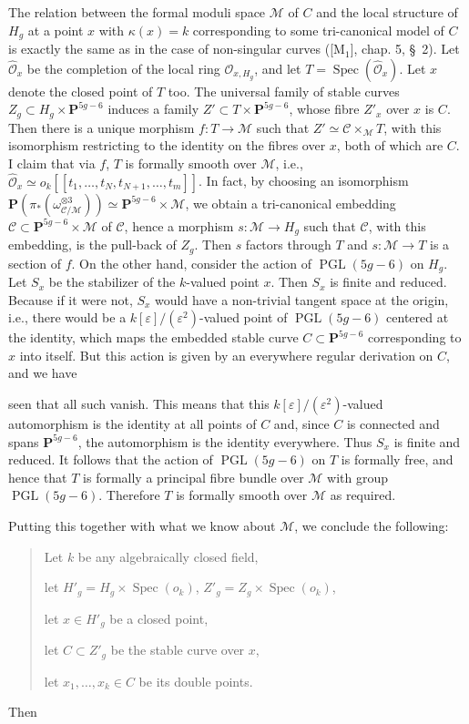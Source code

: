 \documentclass[10pt]{article}
\newcommand{\Spec}{\operatorname{Spec}}
\newcommand{\PGL}{\operatorname{PGL}}
\newcommand{\cO}{\mathcal O}
\newcommand{\cM}{\mathcal M}
\newcommand{\cC}{\mathcal C}
\newcommand{\PP}{\mathbf P}
\newcommand{\eps}{\varepsilon}
\begin{document}
The relation between the formal moduli space $\cM$ of $C$ and the local structure of $H_g$ at a point $x$ with $\kappa(x)=k$ corresponding to some tri-canonical model of $C$ is exactly the same as in the case of non-singular curves ([M$_1$], chap. 5, \S~2). Let $\widehat{\cO}_x$ be the completion of the local ring $\cO_{x,H_g}$, and let $T=\Spec(\widehat{\cO}_x)$. Let $x$ denote the closed point of $T$ too. The universal family of stable curves $Z_g\subset H_g\times\PP^{5g-6}$ induces a family $Z'\subset T\times\PP^{5g-6}$, whose fibre $Z'_x$ over $x$ is $C$. Then there is a unique morphism $f:T\to\cM$ such that $Z'\simeq\cC\times_{\cM}T$, with this isomorphism restricting to the identity on the fibres over $x$, both of which are $C$. I claim that via $f$, $T$ is formally smooth over $\cM$, i.e., $\widehat{\cO}_x\simeq o_k[[t_1,\ldots,t_N,t_{N+1},\ldots,t_m]]$. In fact, by choosing an isomorphism $\PP(\pi_*(\omega_{\cC/\cM}^{\otimes3}))\simeq\PP^{5g-6}\times\cM$, we obtain a tri-canonical embedding $\cC\subset\PP^{5g-6}\times\cM$ of $\cC$, hence a morphism $s:\cM\to H_g$ such that $\cC$, with this embedding, is the pull-back of $Z_g$. Then $s$ factors through $T$ and $s:\cM\to T$ is a section of $f$. On the other hand, consider the action of $\PGL(5g-6)$ on $H_g$. Let $S_x$ be the stabilizer of the $k$-valued point $x$. Then $S_x$ is finite and reduced. Because if it were not, $S_x$ would have a non-trivial tangent space at the origin, i.e., there would be a $k[\eps]/(\eps^2)$-valued point of $\PGL(5g-6)$ centered at the identity, which maps the embedded stable curve $C\subset\PP^{5g-6}$ corresponding to $x$ into itself. But this action is given by an everywhere regular derivation on $C$, and we have


seen that all such vanish. This means that this $k[\eps]/(\eps^2)$-valued automorphism is the identity at all points of $C$ and, since $C$ is connected and spans $\PP^{5g-6}$, the automorphism is the identity everywhere. Thus $S_x$ is finite and reduced. It follows that the action of $\PGL(5g-6)$ on $T$ is formally free, and hence that $T$ is formally a principal fibre bundle over $\cM$ with group $\PGL(5g-6)$. Therefore $T$ is formally smooth over $\cM$ as required.

Putting this together with what we know about $\cM$, we conclude the following:

\begin{quote}
Let $k$ be any algebraically closed field,\par
let $H'_g=H_g\times\Spec(o_k)$, $Z'_g=Z_g\times\Spec(o_k)$,\par
let $x\in H'_g$ be a closed point,\par
let $C\subset Z'_g$ be the stable curve over $x$,\par
let $x_1,\ldots,x_k\in C$ be its double points.
\end{quote}
Then
\end{document}
